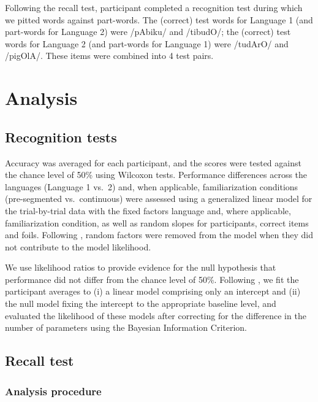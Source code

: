 \documentclass[
]{article}
\begin{document}
Following the recall test, participant completed a recognition test
during which we pitted words against part-words. The (correct) test
words for Language 1 (and part-words for Language 2) were /pAbiku/ and
/tibudO/; the (correct) test words for Language 2 (and part-words for
Language 1) were /tudArO/ and /pigOlA/. These items were combined into 4
test pairs.

\hypertarget{analysis}{%
\section{Analysis}\label{analysis}}

\hypertarget{recognition-tests}{%
\subsection{Recognition tests}\label{recognition-tests}}

Accuracy was averaged for each participant, and the scores were tested
against the chance level of 50\% using Wilcoxon tests. Performance
differences across the languages (Language 1 vs.~2) and, when
applicable, familiarization conditions (pre-segmented vs.~continuous)
were assessed using a generalized linear model for the trial-by-trial
data with the fixed factors language and, where applicable,
familiarization condition, as well as random slopes for participants,
correct items and foils. Following \citep{Baayen2008}, random factors
were removed from the model when they did not contribute to the model
likelihood.

We use likelihood ratios to provide evidence for the null hypothesis
that performance did not differ from the chance level of 50\%. Following
\citep{Glover2004}, we fit the participant averages to (i) a linear
model comprising only an intercept and (ii) the null model fixing the
intercept to the appropriate baseline level, and evaluated the
likelihood of these models after correcting for the difference in the
number of parameters using the Bayesian Information Criterion.

\hypertarget{recall-test-1}{%
\subsection{Recall test}\label{recall-test-1}}

\hypertarget{analysis-procedure}{%
\subsubsection{Analysis procedure}\label{analysis-procedure}}
\end{document}
